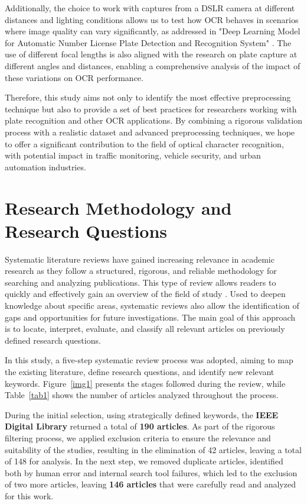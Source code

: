 \documentclass[conference]{IEEEtran}
\begin{document}
    Additionally, the choice to work with captures from a DSLR camera at different distances and lighting conditions allows us to test how OCR behaves in scenarios where image quality can vary significantly, as addressed in "Deep Learning Model for Automatic Number License Plate Detection and Recognition System" \cite{b3}. The use of different focal lengths is also aligned with the research on plate capture at different angles and distances, enabling a comprehensive analysis of the impact of these variations on OCR performance.
    
    Therefore, this study aims not only to identify the most effective preprocessing technique but also to provide a set of best practices for researchers working with plate recognition and other OCR applications. By combining a rigorous validation process with a realistic dataset and advanced preprocessing techniques, we hope to offer a significant contribution to the field of optical character recognition, with potential impact in traffic monitoring, vehicle security, and urban automation industries.
    
    \section{Research Methodology and Research Questions}
    Systematic literature reviews have gained increasing relevance in academic research as they follow a structured, rigorous, and reliable methodology for searching and analyzing publications. This type of review allows readers to quickly and effectively gain an overview of the field of study \cite{b4}. Used to deepen knowledge about specific areas, systematic reviews also allow the identification of gaps and opportunities for future investigations. The main goal of this approach is to locate, interpret, evaluate, and classify all relevant articles on previously defined research questions.
    
    In this study, a five-step systematic review process was adopted, aiming to map the existing literature, define research questions, and identify new relevant keywords. Figure~\ref{img1} presents the stages followed during the review, while Table~\ref{tab1} shows the number of articles analyzed throughout the process.
    
    During the initial selection, using strategically defined keywords, the \textbf{IEEE Digital Library} returned a total of \textbf{190 articles}. As part of the rigorous filtering process, we applied exclusion criteria to ensure the relevance and suitability of the studies, resulting in the elimination of 42 articles, leaving a total of 148 for analysis. In the next step, we removed duplicate articles, identified both by human error and internal search tool failures, which led to the exclusion of two more articles, leaving \textbf{146 articles} that were carefully read and analyzed for this work.
    
\end{document}
